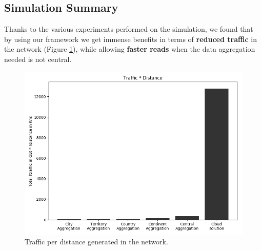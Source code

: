\subsection{Simulation Summary}
Thanks to the various experiments performed on the simulation, we found that by using our framework we get immense benefits in terms of \textbf{reduced traffic} in the network (Figure \ref{fig:write-by-traffic1}), while allowing \textbf{faster reads} when the data aggregation needed is not central.

\begin{figure}
    \centering
    \includegraphics[width=0.99\linewidth]{Figures/Evaluation/write-by-traffic1-simplified.png}
    \caption{Traffic per distance generated in the network.}
    \label{fig:write-by-traffic1}
\end{figure}

